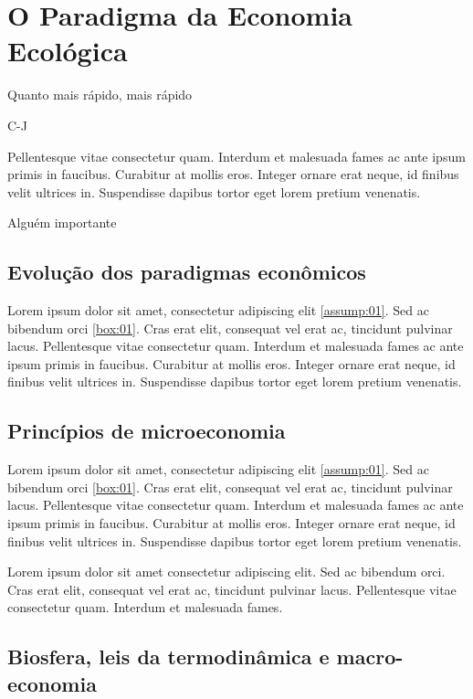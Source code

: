 \documentclass[./main.tex]{subfiles}
\begin{document}
\chapter{O Paradigma da Economia Ecológica} \label{chap:ecoeco}

\epigraph{Quanto mais rápido, mais rápido}{C-J}

\epigraph{Pellentesque vitae consectetur quam. Interdum et malesuada fames ac ante ipsum primis in faucibus. Curabitur at mollis eros. Integer ornare erat neque, id finibus velit ultrices in. Suspendisse dapibus tortor eget lorem pretium venenatis.}{Alguém importante}

\section{Evolução dos paradigmas econômicos} \label{chap:ecoeco:sec1}

\par Lorem ipsum dolor sit amet, consectetur adipiscing elit \ref{assump:01}. Sed ac bibendum orci \ref{box:01}. Cras erat elit, consequat vel erat ac, tincidunt pulvinar lacus. Pellentesque vitae consectetur quam. Interdum et malesuada fames ac ante ipsum primis in faucibus. Curabitur at mollis eros. Integer ornare erat neque, id finibus velit ultrices in. Suspendisse dapibus tortor eget lorem pretium venenatis.

\section{Princípios de microeconomia} \label{chap:ecoeco:sec1}

\par Lorem ipsum dolor sit amet, consectetur adipiscing elit \ref{assump:01}. Sed ac bibendum orci \ref{box:01}. Cras erat elit, consequat vel erat ac, tincidunt pulvinar lacus. Pellentesque vitae consectetur quam. Interdum et malesuada fames ac ante ipsum primis in faucibus. Curabitur at mollis eros. Integer ornare erat neque, id finibus velit ultrices in. Suspendisse dapibus tortor eget lorem pretium venenatis.

\par Lorem ipsum dolor sit amet consectetur adipiscing elit. Sed ac bibendum orci. Cras \cite{popper2004logica} erat elit, consequat vel erat ac, tincidunt pulvinar lacus. Pellentesque vitae consectetur quam. Interdum et malesuada fames.

\section{Biosfera, leis da termodinâmica e macro-economia}
\end{document}
